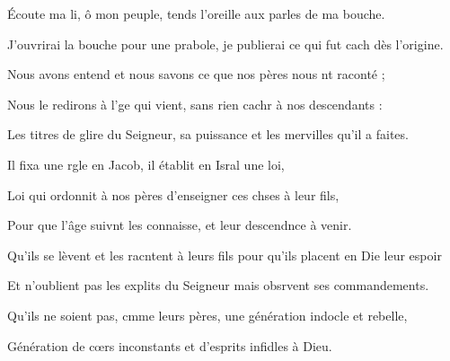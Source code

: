 \item Écoute ma li, ô mon peuple,\psstar{} tends l’oreille aux parles de ma bouche.
\item J’ouvrirai la bouche pour une prabole,\psstar{} je publierai ce qui fut cach dès l’origine.
\item Nous avons entend et nous savons\psstar{} ce que nos pères nous nt raconté ;
\item Nous le redirons à l’ge qui vient,\psstar{} sans rien cachr à nos descendants :
\item Les titres de glire du Seigneur,\psstar{} sa puissance et les mervilles qu’il a faites.
\item Il fixa une rgle en Jacob,\psstar{} il établit en Isral une loi,
\item Loi qui ordonnit à nos pères\psstar{} d’enseigner ces chses à leur fils,
\item Pour que l’âge suivnt les connaisse,\psstar{} et leur descendnce à venir.
\item Qu’ils se lèvent et les racntent à leurs fils\psstar{} pour qu’ils placent en Die leur espoir
\item Et n’oublient pas les explits du Seigneur\psstar{} mais obsrvent ses commandements.
\item Qu’ils ne soient pas, cmme leurs pères,\psstar{} une génération indocle et rebelle,
\item Génération de cœrs inconstants\psstar{} et d’esprits infidles à Dieu.